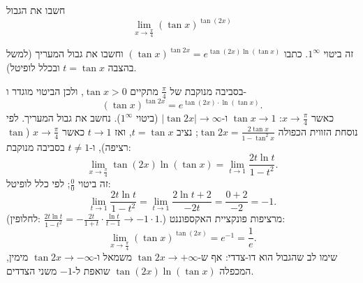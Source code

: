 
\begin{question}
חשבו את הגבול
\[ \lim_{x\to\frac{\pi}{4}} (\tan x)^{\tan(2x)} \]
\end{question}

\begin{hint}
זה ביטוי $1^\infty$. כתבו $(\tan x)^{\tan 2x} = e^{\tan(2x)\ln(\tan x)}$ וחשבו את גבול המעריך (למשל בהצבה $t = \tan x$ ובכלל לופיטל).
\end{hint}

\begin{solution}
בסביבה מנוקבת של $\frac{\pi}{4}$ מתקיים $\tan x > 0$, ולכן הביטוי מוגדר ו-
\[ (\tan x)^{\tan 2x} = e^{\tan(2x)\cdot\ln(\tan x)}. \]
כאשר $x \to \frac{\pi}{4}$: $\tan x \to 1$ ו-$|\tan 2x| \to \infty$ (ביטוי $1^\infty$). נחשב את גבול המעריך. לפי נוסחת הזווית הכפולה $\tan 2x = \frac{2\tan x}{1 - \tan^2 x}$; נציב $t = \tan x$, ואז $t \to 1$ כאשר $x \to \frac{\pi}{4}$ ($\tan$ רציפה), ו-$t \ne 1$ בסביבה מנוקבת:
\[ \lim_{x\to\frac{\pi}{4}} \tan(2x)\ln(\tan x) = \lim_{t\to1} \frac{2t\ln t}{1 - t^2}. \]
זה ביטוי $\frac00$; לפי כלל לופיטל:
\[ \lim_{t\to1} \frac{2t\ln t}{1 - t^2} = \lim_{t\to1} \frac{2\ln t + 2}{-2t} = \frac{0 + 2}{-2} = -1. \]
(לחלופין: $\frac{2t\ln t}{1 - t^2} = -\frac{2t}{1 + t}\cdot\frac{\ln t}{t - 1} \to -1\cdot 1$.)
מרציפות פונקציית האקספוננט:
\[ \boxed{\lim_{x\to\frac{\pi}{4}} (\tan x)^{\tan(2x)} = e^{-1} = \frac1e}. \]
שימו לב שהגבול הוא דו-צדדי: אף ש-$\tan 2x \to +\infty$ משמאל ו-$\tan 2x \to -\infty$ מימין, המכפלה $\tan(2x)\ln(\tan x)$ שואפת ל-$-1$ משני הצדדים.
\end{solution}
